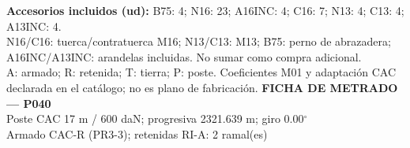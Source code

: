 \begingroup\scriptsize
\textbf{Accesorios incluidos (ud):} B75: 4; N16: 23; A16INC: 4; C16: 7; N13: 4; C13: 4; A13INC: 4.\\
N16/C16: tuerca/contratuerca M16; N13/C13: M13; B75: perno de abrazadera; A16INC/A13INC: arandelas incluidas. No sumar como compra adicional.\\
A: armado; R: retenida; T: tierra; P: poste. Coeficientes M01 y adaptación CAC declarada en el catálogo; no es plano de fabricación.
\endgroup\endgroup
\clearpage{}
\begingroup\small\setlength{\parskip}{3pt}\renewcommand{\arraystretch}{1.05}
\textbf{\large FICHA DE METRADO — P040}\\[4pt]
Poste CAC 17 m / 600 daN; progresiva 2321.639 m; giro 0.00\ensuremath{^\circ}\\
Armado CAC-R (PR3-3); retenidas RI-A: 2 ramal(es)\\
\begingroup\scriptsize
